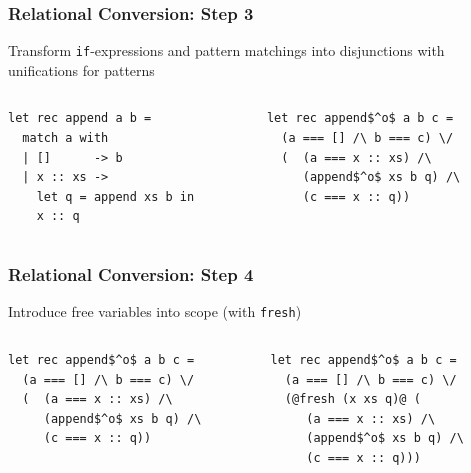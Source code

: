\documentclass[xcolor=table]{beamer}
\begin{document}
\begin{frame}[fragile]
  \transwipe[direction=90]
  \frametitle{Relational Conversion: Step 3}
  
Transform \lstinline{if}-expressions and pattern matchings into disjunctions with unifications for patterns

\begin{columns}
\begin{column}{0.5\textwidth}
\begin{lstlisting}
let rec append a b =
  match a with 
  | []      -> b
  | x :: xs -> 
    let q = append xs b in
    x :: q
\end{lstlisting}
\end{column}
\begin{column}{0.5\textwidth}  
\begin{lstlisting}
let rec append$^o$ a b c =
  (a === [] /\ b === c) \/
  (  (a === x :: xs) /\
     (append$^o$ xs b q) /\
     (c === x :: q))
\end{lstlisting}
\end{column}
\end{columns}
\end{frame}

\begin{frame}[fragile]
  \transwipe[direction=90]
  \frametitle{Relational Conversion: Step 4}

Introduce free variables into scope  (with \lstinline{fresh})

\begin{columns}
\begin{column}{0.5\textwidth}
\begin{lstlisting}
let rec append$^o$ a b c =
  (a === [] /\ b === c) \/
  (  (a === x :: xs) /\
     (append$^o$ xs b q) /\
     (c === x :: q))
\end{lstlisting}
\end{column}
\begin{column}{0.5\textwidth}  
\begin{lstlisting}
let rec append$^o$ a b c =
  (a === [] /\ b === c) \/
  (@fresh (x xs q)@ (
     (a === x :: xs) /\
     (append$^o$ xs b q) /\
     (c === x :: q)))
\end{lstlisting}
\end{column}
\end{columns}
\end{frame}
\end{document}
